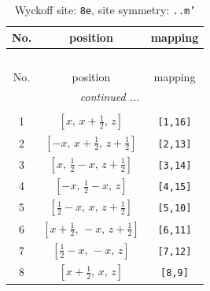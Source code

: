 \documentclass[fleqn,8pt]{jsarticle}
\begin{document}
\renewcommand{\arraystretch}{1.2}
\begin{longtable}{ccc}
\caption{Wyckoff site: {\tt 8e}, site symmetry: {\tt ..m'}}
 \\
 \hline \hline
No. & position & mapping \\ \hline \endfirsthead

\multicolumn{2}{l}{\tablename\ \thetable{}} \\
 \hline \hline
No. & position & mapping \\ \hline \endhead

 \hline \hline
\multicolumn{2}{r}{\footnotesize\it continued ...} \\ \endfoot

 \hline \hline
\multicolumn{2}{r}{} \\ \endlastfoot

1 & $\left[ x,\, x + \frac{1}{2},\, z \right]$ & {\tt [1,16]} \\ \hline
2 & $\left[ - x,\, x + \frac{1}{2},\, z + \frac{1}{2} \right]$ & {\tt [2,13]} \\ \hline
3 & $\left[ x,\, \frac{1}{2} - x,\, z + \frac{1}{2} \right]$ & {\tt [3,14]} \\ \hline
4 & $\left[ - x,\, \frac{1}{2} - x,\, z \right]$ & {\tt [4,15]} \\ \hline
5 & $\left[ \frac{1}{2} - x,\, x,\, z + \frac{1}{2} \right]$ & {\tt [5,10]} \\ \hline
6 & $\left[ x + \frac{1}{2},\, - x,\, z + \frac{1}{2} \right]$ & {\tt [6,11]} \\ \hline
7 & $\left[ \frac{1}{2} - x,\, - x,\, z \right]$ & {\tt [7,12]} \\ \hline
8 & $\left[ x + \frac{1}{2},\, x,\, z \right]$ & {\tt [8,9]} \\
\end{longtable}
\renewcommand{\arraystretch}{1.2}
\end{document}
